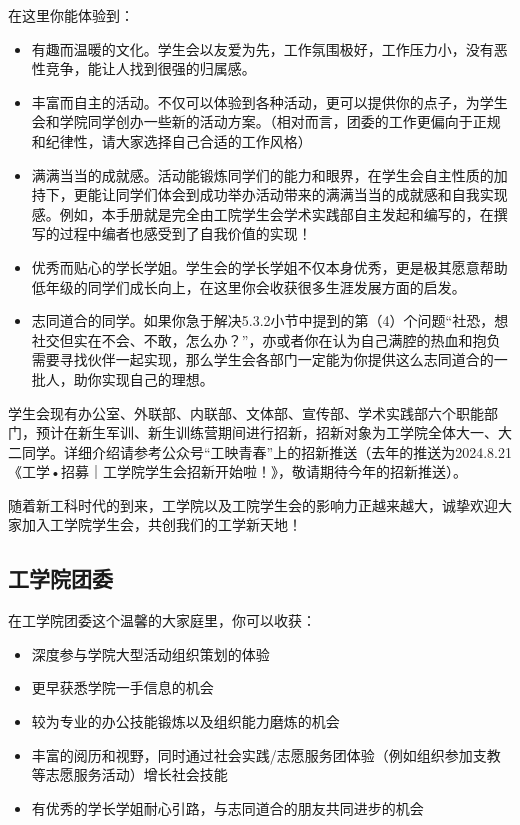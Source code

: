 \documentclass[11pt,oneside]{book}
\begin{document}
在这里你能体验到：
\begin{itemize}
	\item 有趣而温暖的文化。学生会以友爱为先，工作氛围极好，工作压力小，没有恶性竞争，能让人找到很强的归属感。
	\item 丰富而自主的活动。不仅可以体验到各种活动，更可以提供你的点子，为学生会和学院同学创办一些新的活动方案。（相对而言，团委的工作更偏向于正规和纪律性，请大家选择自己合适的工作风格）
	\item 满满当当的成就感。活动能锻炼同学们的能力和眼界，在学生会自主性质的加持下，更能让同学们体会到成功举办活动带来的满满当当的成就感和自我实现感。例如，本手册就是完全由工院学生会学术实践部自主发起和编写的，在撰写的过程中编者也感受到了自我价值的实现！
	\item 优秀而贴心的学长学姐。学生会的学长学姐不仅本身优秀，更是极其愿意帮助低年级的同学们成长向上，在这里你会收获很多生涯发展方面的启发。
	\item 志同道合的同学。如果你急于解决5.3.2小节中提到的第（4）个问题“社恐，想社交但实在不会、不敢，怎么办？”，亦或者你在认为自己满腔的热血和抱负需要寻找伙伴一起实现，那么学生会各部门一定能为你提供这么志同道合的一批人，助你实现自己的理想。
\end{itemize}
学生会现有办公室、外联部、内联部、文体部、宣传部、学术实践部六个职能部门，预计在新生军训、新生训练营期间进行招新，招新对象为工学院全体大一、大二同学。详细介绍请参考公众号“工映青春”上的招新推送（去年的推送为2024.8.21《工学•招募｜工学院学生会招新开始啦！》，敬请期待今年的招新推送）。

随着新工科时代的到来，工学院以及工院学生会的影响力正越来越大，诚挚欢迎大家加入工学院学生会，共创我们的工学新天地！
\subsection{工学院团委}

在工学院团委这个温馨的大家庭里，你可以收获：

\begin{itemize}
	
	\item 深度参与学院大型活动组织策划的体验
	\item 更早获悉学院一手信息的机会
	\item 较为专业的办公技能锻炼以及组织能力磨炼的机会
	\item 丰富的阅历和视野，同时通过社会实践/志愿服务团体验（例如组织参加支教等志愿服务活动）增长社会技能
	\item 有优秀的学长学姐耐心引路，与志同道合的朋友共同进步的机会
\end{itemize}
\end{document}
